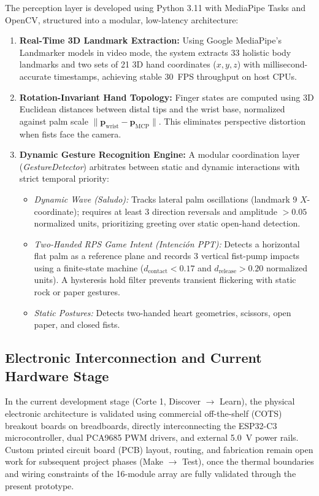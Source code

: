 \documentclass[lettersize,journal]{IEEEtran}
\begin{document}
The perception layer is developed using Python 3.11 with MediaPipe Tasks and OpenCV, structured into a modular, low-latency architecture:
\begin{enumerate}
\item \textbf{Real-Time 3D Landmark Extraction:} Using Google MediaPipe's Landmarker models in video mode, the system extracts 33 holistic body landmarks and two sets of 21 3D hand coordinates ($x, y, z$) with millisecond-accurate timestamps, achieving stable 30~FPS throughput on host CPUs.
\item \textbf{Rotation-Invariant Hand Topology:} Finger states are computed using 3D Euclidean distances between distal tips and the wrist base, normalized against palm scale $\lVert \mathbf{p}_{\text{wrist}} - \mathbf{p}_{\text{MCP}} \rVert$. This eliminates perspective distortion when fists face the camera.
\item \textbf{Dynamic Gesture Recognition Engine:} A modular coordination layer (\textit{GestureDetector}) arbitrates between static and dynamic interactions with strict temporal priority:
\begin{itemize}
\item \textit{Dynamic Wave (Saludo):} Tracks lateral palm oscillations (landmark 9 $X$-coordinate); requires at least 3 direction reversals and amplitude $> 0.05$ normalized units, prioritizing greeting over static open-hand detection.
\item \textit{Two-Handed RPS Game Intent (Intenci{\'o}n PPT):} Detects a horizontal flat palm as a reference plane and records 3 vertical fist-pump impacts using a finite-state machine ($d_{\text{contact}} < 0.17$ and $d_{\text{release}} > 0.20$ normalized units). A hysteresis hold filter prevents transient flickering with static rock or paper gestures.
\item \textit{Static Postures:} Detects two-handed heart geometries, scissors, open paper, and closed fists.
\end{itemize}
\end{enumerate}

\subsection{Electronic Interconnection and Current Hardware Stage}
\label{sec:hardware_stage}

In the current development stage (Corte 1, Discover $\to$ Learn), the physical electronic architecture is validated using commercial off-the-shelf (COTS) breakout boards on breadboards, directly interconnecting the ESP32-C3 microcontroller, dual PCA9685 PWM drivers, and external 5.0~V power rails. Custom printed circuit board (PCB) layout, routing, and fabrication remain open work for subsequent project phases (Make $\to$ Test), once the thermal boundaries and wiring constraints of the 16-module array are fully validated through the present prototype.
\end{document}

